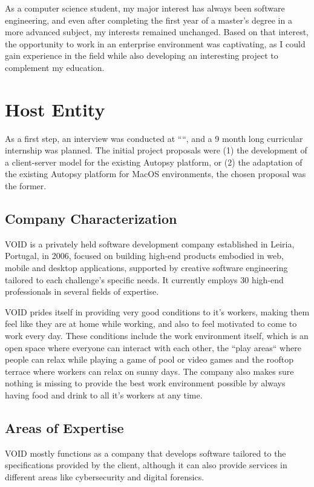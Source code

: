 As a computer science student, my major interest has always been software engineering, and even after completing the first year of a master's degree in a more advanced subject, 
my interests remained unchanged. Based on that interest, the opportunity to work in an enterprise environment was captivating, as I could gain experience in the 
field while also developing an interesting project to complement my education.

\section{Host Entity}

As a first step, an interview was conducted at ``\company``, and a 9 month long curricular internship was planned. The initial project proposals were (1) the development of a 
client-server model for the existing Autopsy platform, or (2) the adaptation of the existing Autopsy platform for MacOS environments, the chosen proposal was the former.

\subsection{Company Characterization}

VOID is a privately held software development company established in Leiria, Portugal, in 2006, focused on building high-end products embodied in web, 
mobile and desktop applications, supported by creative software engineering tailored to each challenge's specific needs. 
It currently employs 30 high-end professionals in several fields of expertise.

VOID prides itself in providing very good conditions to it's workers, making them feel like they are at home while working,
and also to feel motivated to come to work every day. These conditions include the work environment itself, which is an open space where 
everyone can interact with each other, the ``play areas`` where people can relax while playing a game of pool or video games and the rooftop terrace where workers can relax on sunny days.
The company also makes sure nothing is missing to provide the best work environment possible by always having food and drink to all it's workers at any time.

\subsection{Areas of Expertise}

VOID mostly functions as a company that develops software tailored to the specifications provided by the client, although 
it can also provide services in different areas like cybersecurity and digital forensics.

